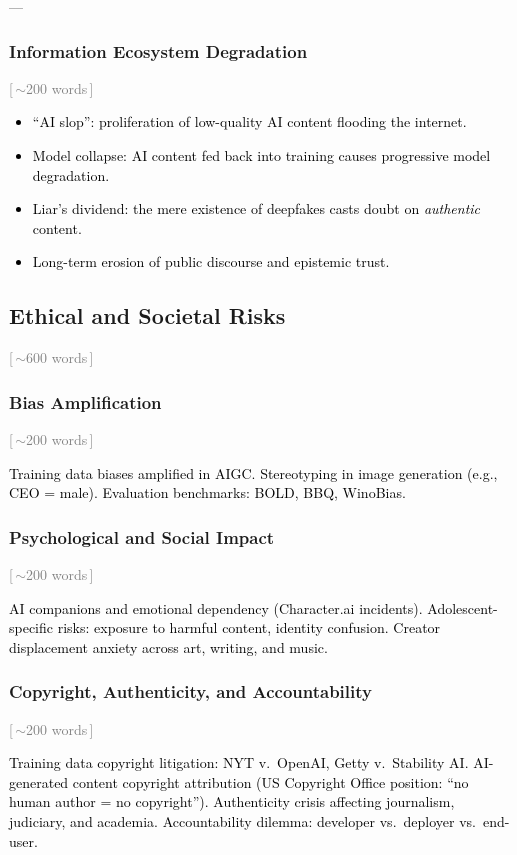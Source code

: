 ––\documentclass[preprint,12pt]{elsarticle}
\newcommand{\wordcount}[1]{\hfill\textcolor{gray}{\small[\,#1\,]}}
\newcommand{\outline}[1]{\textcolor{black}{#1}}
\begin{document}
\subsubsection{Information Ecosystem Degradation} \wordcount{$\sim$200 words}

\outline{%
\begin{itemize}[nosep,leftmargin=1.5em]
    \item ``AI slop'': proliferation of low-quality AI content flooding the internet.
    \item Model collapse: AI content fed back into training causes progressive model degradation.
    \item Liar's dividend: the mere existence of deepfakes casts doubt on \emph{authentic} content.
    \item Long-term erosion of public discourse and epistemic trust.
\end{itemize}
}


\subsection{Ethical and Societal Risks} \wordcount{$\sim$600 words}
\label{sec:threat-ethics}

\subsubsection{Bias Amplification} \wordcount{$\sim$200 words}

\outline{%
Training data biases amplified in AIGC. Stereotyping in image generation (e.g., CEO = male). Evaluation benchmarks: BOLD, BBQ, WinoBias.
}

\subsubsection{Psychological and Social Impact} \wordcount{$\sim$200 words}

\outline{%
AI companions and emotional dependency (Character.ai incidents). Adolescent-specific risks: exposure to harmful content, identity confusion. Creator displacement anxiety across art, writing, and music.
}

\subsubsection{Copyright, Authenticity, and Accountability} \wordcount{$\sim$200 words}

\outline{%
Training data copyright litigation: NYT v.\ OpenAI, Getty v.\ Stability AI. AI-generated content copyright attribution (US Copyright Office position: ``no human author = no copyright''). Authenticity crisis affecting journalism, judiciary, and academia. Accountability dilemma: developer vs.\ deployer vs.\ end-user.
}
\end{document}
